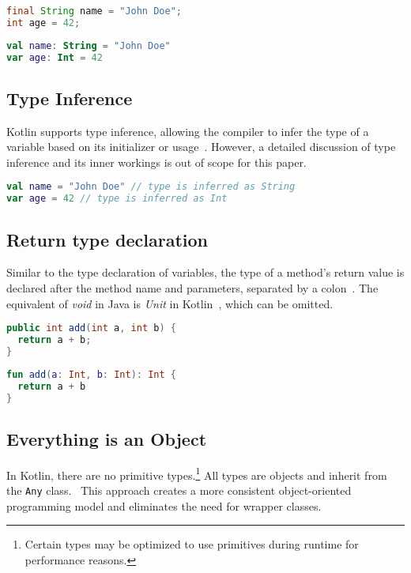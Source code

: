 \documentclass[a4paper, 11pt]{article}
\begin{document}
\begin{lstlisting}[language=Java,title={Java data types}]
final String name = "John Doe";
int age = 42;
\end{lstlisting}

\begin{lstlisting}[language=Kotlin,title={Kotlin data types}]
val name: String = "John Doe"
var age: Int = 42
\end{lstlisting}

\subsection{Type Inference}
Kotlin supports type inference, allowing the compiler to infer the type of a variable based on its initializer or usage~\cite{type-inference}. 
However, a detailed discussion of type inference and its inner workings is out of scope for this paper.

\begin{lstlisting}[language=Kotlin]
val name = "John Doe" // type is inferred as String
var age = 42 // type is inferred as Int
\end{lstlisting}

\subsection{Return type declaration}
Similar to the type declaration of variables, the type of a method's return value is declared after the method name and parameters, separated by a colon~\cite{functions}.
The equivalent of \textit{void} in Java is \textit{Unit} in Kotlin~\cite{builtin-types-unit,kotlin-stdlib-unit}, which can be omitted. 

\begin{lstlisting}[language=Java,title={Java method declaration}]
public int add(int a, int b) {
  return a + b;
}
\end{lstlisting}

\begin{lstlisting}[language=Kotlin,title={Kotlin method declaration}]
fun add(a: Int, b: Int): Int {
  return a + b
}
\end{lstlisting}

\subsection{Everything is an Object}
In Kotlin, there are no primitive types.\footnote{Certain types may be optimized to use primitives during runtime for performance reasons.} All types are objects and inherit from the \texttt{Any} class.~\cite{basic-types}
This approach creates a more consistent object-oriented programming model and eliminates the need for wrapper classes.
\end{document}
